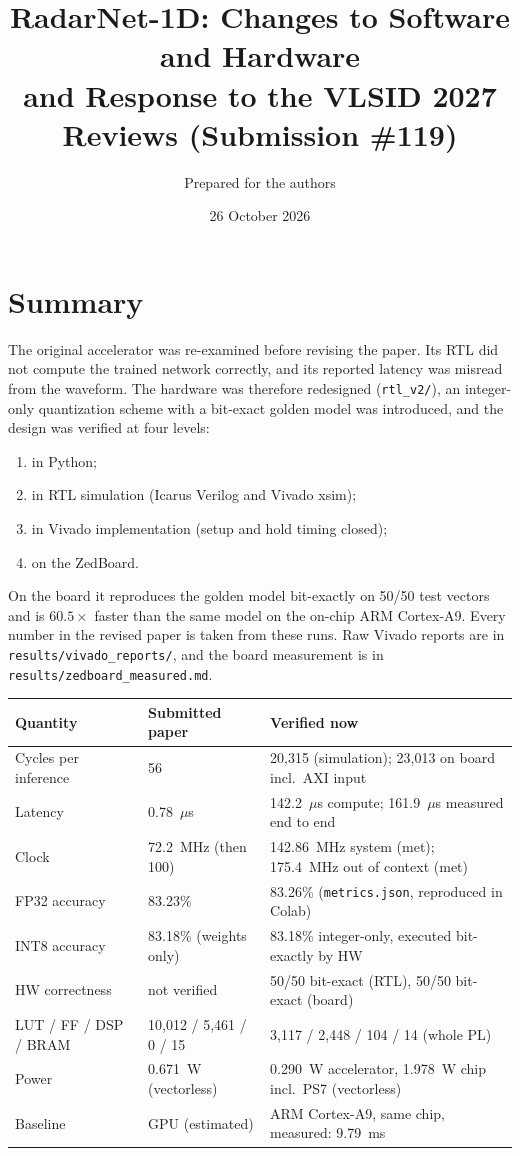 \documentclass[10pt,a4paper]{article}
\title{RadarNet-1D: Changes to Software and Hardware\\ and Response to the VLSID 2027 Reviews (Submission \#119)}
\author{Prepared for the authors}
\date{26 October 2026}
\begin{document}
\maketitle

\section*{Summary}
The original accelerator was re-examined before revising the paper. Its RTL did not compute
the trained network correctly, and its reported latency was misread from the
waveform. The hardware was therefore redesigned (\texttt{rtl\_v2/}), an integer-only
quantization scheme with a bit-exact golden model was introduced, and the design was
verified at four levels:
\begin{enumerate}
  \item in Python;
  \item in RTL simulation (Icarus Verilog and Vivado xsim);
  \item in Vivado implementation (setup and hold timing closed);
  \item on the ZedBoard.
\end{enumerate}
On the board it reproduces the golden model bit-exactly on 50/50 test vectors and is
$60.5\times$ faster than the same model on the on-chip ARM Cortex-A9. Every number in the
revised paper is taken from these runs. Raw Vivado reports are in
\texttt{results/vivado\_reports/}, and the board measurement is in
\texttt{results/zedboard\_measured.md}.

\begin{center}
\small
\begin{tabularx}{\textwidth}{l l L}
\toprule
\textbf{Quantity} & \textbf{Submitted paper} & \textbf{Verified now} \\
\midrule
Cycles per inference & 56 & 20,315 (simulation); 23,013 on board incl.\ AXI input \\
Latency & 0.78~$\mu$s & 142.2~$\mu$s compute; 161.9~$\mu$s measured end to end \\
Clock & 72.2~MHz (then 100) & 142.86~MHz system (met); 175.4~MHz out of context (met) \\
FP32 accuracy & 83.23\% & 83.26\% (\texttt{metrics.json}, reproduced in Colab) \\
INT8 accuracy & 83.18\% (weights only) & 83.18\% integer-only, executed bit-exactly by HW \\
HW correctness & not verified & 50/50 bit-exact (RTL), 50/50 bit-exact (board) \\
LUT / FF / DSP / BRAM & 10,012 / 5,461 / 0 / 15 & 3,117 / 2,448 / 104 / 14 (whole PL) \\
Power & 0.671~W (vectorless) & 0.290~W accelerator, 1.978~W chip incl.\ PS7 (vectorless) \\
Baseline & GPU (estimated) & ARM Cortex-A9, same chip, measured: 9.79~ms \\
\bottomrule
\end{tabularx}
\end{center}
\end{document}
